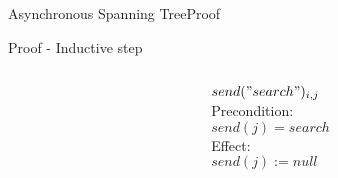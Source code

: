 \documentclass[pdf]{beamer}
\begin{document}
\begin{frame}[plain]{Asynchronous Spanning Tree}{Proof}
\begin{block}{Proof - Inductive step}
\begin{columns}
\begin{column}{.5\textwidth}
    \end{column}
    \begin{column}{.4\textwidth}
            $send("search")_{i,j}$ \\
            \hspace*{2pt} {Precondition:} \\
            \hspace*{5pt} {$send(j) = search$} \\
            \hspace*{2pt} {Effect:} \\
            \hspace*{5pt} {$send(j) := null$} \\
    \end{column}
    \end{columns}
    \end{block}

\end{frame}
\end{document}
